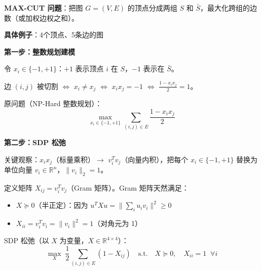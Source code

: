 \documentclass[12pt, a4paper]{ctexart}
\begin{document}
\begin{blackboard}

\textbf{MAX-CUT 问题}：把图 $G=(V,E)$ 的顶点分成两组 $S$ 和 $\bar{S}$，最大化跨组的边数（或加权边权之和）。

\textbf{具体例子}：4个顶点、5条边的图

\begin{center}
\end{center}

\textbf{第一步：整数规划建模}

令 $x_i \in \{-1, +1\}$：$+1$ 表示顶点 $i$ 在 $S$，$-1$ 表示在 $\bar{S}$。

边 $(i,j)$ 被切割 $\Leftrightarrow$ $x_i \neq x_j$ $\Leftrightarrow$ $x_ix_j = -1$ $\Leftrightarrow$ $\frac{1-x_ix_j}{2} = 1$。

原问题（NP-Hard 整数规划）：
\[
\max_{x_i \in \{-1,+1\}} \sum_{(i,j)\in E} \frac{1-x_ix_j}{2}
\]

\textbf{第二步：SDP 松弛}

关键观察：$x_ix_j$（标量乘积）$\longrightarrow$ $v_i^Tv_j$（向量内积），把每个 $x_i \in \{-1,+1\}$ 替换为单位向量 $v_i \in \mathbb{R}^n$，$\|v_i\|_2 = 1$。

定义矩阵 $X_{ij} = v_i^Tv_j$（Gram 矩阵）。Gram 矩阵天然满足：
\begin{itemize}
    \item $X \succeq 0$（半正定）：因为 $u^TXu = \|\sum_i u_i v_i\|^2 \geq 0$
    \item $X_{ii} = v_i^Tv_i = \|v_i\|^2 = 1$（对角元为 1）
\end{itemize}

SDP 松弛（以 $X$ 为变量，$X \in \mathbb{R}^{4\times 4}$）：
\[
\max_X \; \frac{1}{2}\sum_{(i,j)\in E}(1 - X_{ij})
\quad \text{s.t.} \quad X \succeq 0, \quad X_{ii} = 1 \;\; \forall i
\]


\end{blackboard}
\end{document}
